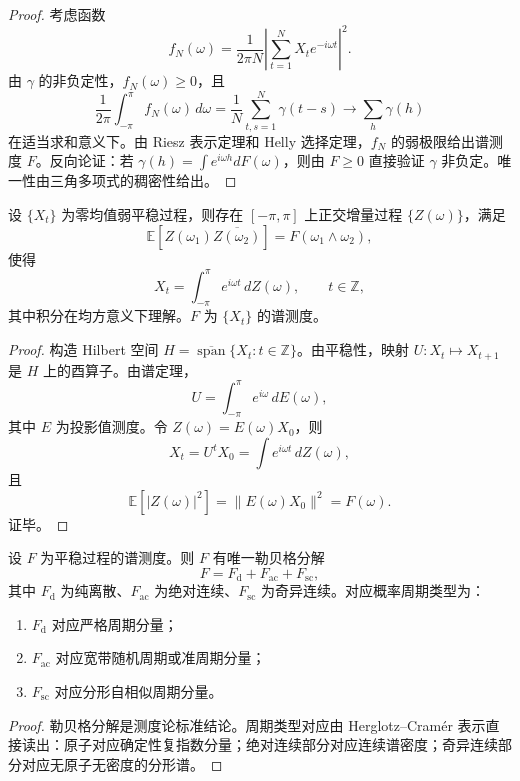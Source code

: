 \begin{proof}
考虑函数
\[
f_N(\omega)=\frac{1}{2\pi N}\left|\sum_{t=1}^{N}X_t e^{-i\omega t}\right|^2.
\]
由 $\gamma$ 的非负定性，$f_N(\omega)\ge0$，且
\[
\frac{1}{2\pi}\int_{-\pi}^{\pi}f_N(\omega)\,d\omega
=\frac{1}{N}\sum_{t,s=1}^{N}\gamma(t-s)
\to \sum_h\gamma(h)
\]
在适当求和意义下。由 Riesz 表示定理和 Helly 选择定理，$f_N$ 的弱极限给出谱测度 $F$。反向论证：若 $\gamma(h)=\int e^{i\omega h}dF(\omega)$，则由 $F\ge0$ 直接验证 $\gamma$ 非负定。唯一性由三角多项式的稠密性给出。
\end{proof}

\begin{theorem}\label{thm:cramer}
设 $\{X_t\}$ 为零均值弱平稳过程，则存在 $[-\pi,\pi]$ 上正交增量过程 $\{Z(\omega)\}$，满足
\[
\mathbb E[Z(\omega_1)\overline{Z(\omega_2)}]=F(\omega_1\wedge\omega_2),
\]
使得
\[
X_t=\int_{-\pi}^{\pi}e^{i\omega t}\,dZ(\omega),\qquad t\in\mathbb Z,
\]
其中积分在均方意义下理解。$F$ 为 $\{X_t\}$ 的谱测度。
\end{theorem}

\begin{proof}
构造 Hilbert 空间 $H=\overline{\operatorname{span}}\{X_t:t\in\mathbb Z\}$。由平稳性，映射 $U:X_t\mapsto X_{t+1}$ 是 $H$ 上的酉算子。由谱定理，
\[
U=\int_{-\pi}^{\pi}e^{i\omega}\,dE(\omega),
\]
其中 $E$ 为投影值测度。令 $Z(\omega)=E(\omega)X_0$，则
\[
X_t=U^tX_0=\int e^{i\omega t}\,dZ(\omega),
\]
且
\[
\mathbb E[|Z(\omega)|^2]=\|E(\omega)X_0\|^2=F(\omega).
\]
证毕。
\end{proof}

\begin{lemma}[谱测度勒贝格分解与周期类型三分]\label{lem:spectral_lebesgue_decomposition}
设 $F$ 为平稳过程的谱测度。则 $F$ 有唯一勒贝格分解
\[
F=F_{\mathrm{d}}+F_{\mathrm{ac}}+F_{\mathrm{sc}},
\]
其中 $F_{\mathrm d}$ 为纯离散、$F_{\mathrm{ac}}$ 为绝对连续、$F_{\mathrm{sc}}$ 为奇异连续。对应概率周期类型为：
\begin{enumerate}[label=(\roman*)]
    \item $F_{\mathrm d}$ 对应严格周期分量；
    \item $F_{\mathrm{ac}}$ 对应宽带随机周期或准周期分量；
    \item $F_{\mathrm{sc}}$ 对应分形自相似周期分量。
\end{enumerate}
\end{lemma}

\begin{proof}
勒贝格分解是测度论标准结论。周期类型对应由 Herglotz--Cramér 表示直接读出：原子对应确定性复指数分量；绝对连续部分对应连续谱密度；奇异连续部分对应无原子无密度的分形谱。
\end{proof}

